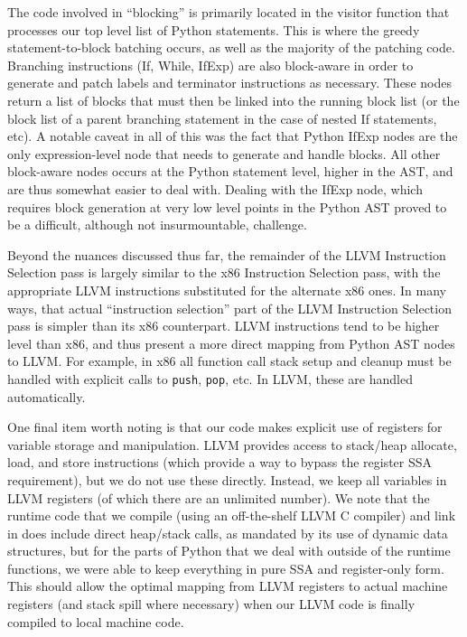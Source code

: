 \documentclass[11pt,twocolumn]{article}
\begin{document}
The code involved in ``blocking'' is primarily located in the visitor
function that processes our top level list of Python statements. This
is where the greedy statement-to-block batching occurs, as well as the
majority of the patching code. Branching instructions (If, While,
IfExp) are also block-aware in order to generate and patch labels and
terminator instructions as necessary. These nodes return a list of
blocks that must then be linked into the running block list (or the
block list of a parent branching statement in the case of nested If
statements, etc). A notable caveat in all of this was the fact that
Python IfExp nodes are the only expression-level node that needs to
generate and handle blocks. All other block-aware nodes occurs at the
Python statement level, higher in the AST, and are thus somewhat
easier to deal with. Dealing with the IfExp node, which requires block
generation at very low level points in the Python AST proved to be a
difficult, although not insurmountable, challenge.


Beyond the nuances discussed thus far, the remainder of the LLVM
Instruction Selection pass is largely similar to the x86 Instruction
Selection pass, with the appropriate LLVM instructions substituted for
the alternate x86 ones. In many ways, that actual ``instruction
selection'' part of the LLVM Instruction Selection pass is simpler
than its x86 counterpart. LLVM instructions tend to be higher level
than x86, and thus present a more direct mapping from Python AST nodes
to LLVM. For example, in x86 all function call stack setup and cleanup
must be handled with explicit calls to \texttt{push}, \texttt{pop},
etc. In LLVM, these are handled automatically.

One final item worth noting is that our code makes explicit use of
registers for variable storage and manipulation. LLVM provides access
to stack/heap allocate, load, and store instructions (which provide a
way to bypass the register SSA requirement), but we do not use these
directly. Instead, we keep all variables in LLVM registers (of which
there are an unlimited number). We note that the runtime code that we
compile (using an off-the-shelf LLVM C compiler) and link in does
include direct heap/stack calls, as mandated by its use of dynamic
data structures, but for the parts of Python that we deal with outside
of the runtime functions, we were able to keep everything in pure SSA
and register-only form. This should allow the optimal mapping from
LLVM registers to actual machine registers (and stack spill where
necessary) when our LLVM code is finally compiled to local machine
code.
\end{document}
